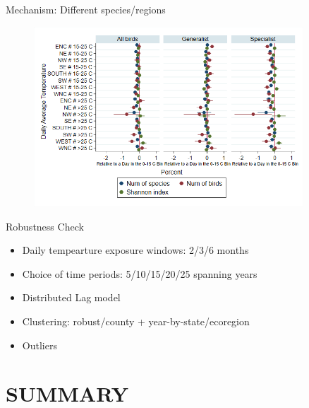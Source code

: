 \documentclass{beamer}
\begin{document}
\begin{frame}{Mechanism: Different species/regions}
  \begin{figure}[h]
  \centering
  \includegraphics[width=0.9\textwidth]{bird_figure3.png}
  \end{figure}
\end{frame}

\begin{frame}{Robustness Check}
 \begin{itemize}
   \item Daily tempearture exposure windows: 2/3/6 months
   \item Choice of time periods: 5/10/15/20/25 spanning years
   \item Distributed Lag model
   \item Clustering: robust/county + year-by-state/ecoregion
   \item Outliers
 \end{itemize}
\end{frame}



\section*{SUMMARY}
\end{document}

